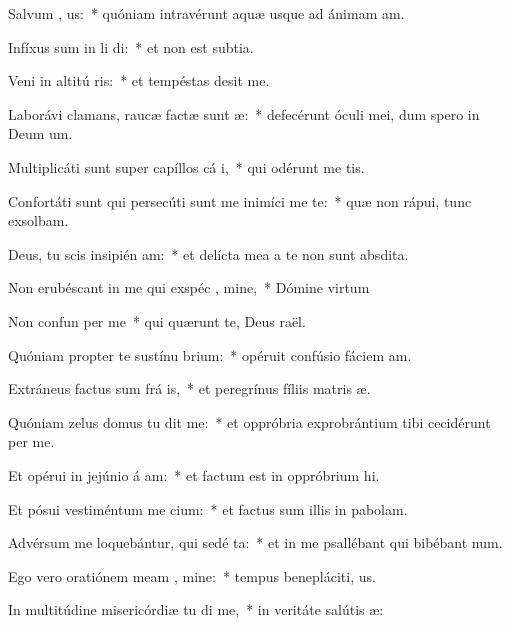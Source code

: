 \item Salvum  , us:~* quóniam intravérunt aquæ usque ad ánimam am.
\item Infíxus sum in li di:~* et non est subtia.
\item Veni in altitú ris:~* et tempéstas desit me.
\item Laborávi clamans, raucæ factæ sunt  æ:~* defecérunt óculi mei, dum spero in Deum um.
\item Multiplicáti sunt super capíllos cá i,~* qui odérunt me tis.
\item Confortáti sunt qui persecúti sunt me inimíci me te:~* quæ non rápui, tunc exsolbam.
\item Deus, tu scis insipién am:~* et delícta mea a te non sunt absdita.
\item Non erubéscant in me qui exspéc , mine,~* Dómine virtum
\item Non confun per me~* qui quærunt te, Deus raël.
\item Quóniam propter te sustínu brium:~* opéruit confúsio fáciem am.
\item Extráneus factus sum frá is,~* et peregrínus fíliis matris æ.
\item Quóniam zelus domus tu dit me:~* et oppróbria exprobrántium tibi cecidérunt per me.
\item Et opérui in jejúnio á am:~* et factum est in oppróbrium hi.
\item Et pósui vestiméntum me cium:~* et factus sum illis in pabolam.
\item Advérsum me loquebántur, qui sedé  ta:~* et in me psallébant qui bibébant num.
\item Ego vero oratiónem meam  , mine:~* tempus benepláciti, us.
\item In multitúdine misericórdiæ tu di me,~* in veritáte salútis æ:
